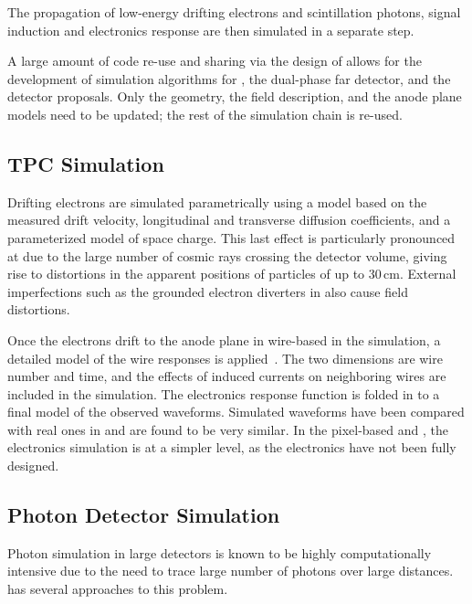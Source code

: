 \documentclass[../main-v1.tex]{subfiles}
\begin{document}
The propagation of low-energy drifting electrons and scintillation photons, signal induction  and electronics response are then simulated in a separate step.  

A large amount of code re-use and sharing via the design of  allows for the development of simulation algorithms for , the dual-phase far detector, 
and the  detector proposals.  Only the geometry, the field description, and the anode plane models need to be updated; the rest of the simulation chain is re-used.

\subsection{TPC Simulation}

Drifting electrons are simulated parametrically using a model based on the measured drift velocity, longitudinal and transverse diffusion coefficients, and a parameterized model of space charge.  This last effect is particularly pronounced at  due to the large number of cosmic rays crossing the detector volume, giving rise to distortions in the apparent positions of particles of up to 30\,cm.  %
External imperfections such as the grounded electron diverters in  also cause field distortions.

Once the electrons drift to the anode plane in wire-based  in the simulation, a detailed \twod model of the wire responses is applied~\cite{Abi:2020mwi}.  The two dimensions are wire number and time, and the effects of induced currents on neighboring wires are included in the simulation.  The electronics response function is folded in to a final model of the observed waveforms.  Simulated waveforms have been compared with real ones  in  and are found to be very similar.
In the pixel-based  and , the electronics simulation is at a simpler level, as the electronics have not been fully designed.

\subsection{Photon Detector Simulation }

Photon simulation in large detectors is known to be highly computationally intensive due to the need to trace large number of photons over large distances.   has several approaches to this problem. 
\end{document}
